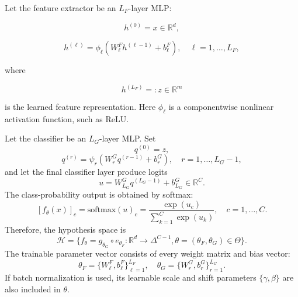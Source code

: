 \documentclass[11pt,a4paper]{article}
\theoremstyle{definition}
\begin{document}
Let the feature extractor be an $L_F$-layer MLP:

\[
h^{(0)} = x \in \mathbb{R}^d,
\]

\[
h^{(\ell)} = \phi_\ell \left( W_\ell^F h^{(\ell-1)} + b_\ell^F \right), \quad \ell = 1, \dots, L_F,
\]

where

\[
h^{(L_F)} =: z \in \mathbb{R}^m
\]

is the learned feature representation. Here $\phi_\ell$ is a componentwise nonlinear activation function, such as ReLU.

Let the classifier be an $L_G$-layer MLP. Set
\[
q^{(0)} = z,
\]
\[
q^{(r)} = \psi_r \left( W_r^G q^{(r-1)} + b_r^G \right), \quad r = 1, \dots, L_G - 1,
\]
and let the final classifier layer produce logits
\[
u = W_{L_G}^G q^{(L_G-1)} + b_{L_G}^G \in \mathbb{R}^C.
\]
The class-probability output is obtained by softmax:
\[
[f_\theta(x)]_c = \text{softmax}(u)_c = \frac{\exp(u_c)}{\sum_{k=1}^C \exp(u_k)}, \quad c = 1, \dots, C.
\]
Therefore, the hypothesis space is
\[
\mathcal{H} = \{ f_\theta = g_{\theta_G} \circ e_{\theta_F} : \mathbb{R}^d \to \Delta^{C-1}, \theta = (\theta_F, \theta_G) \in \Theta \}.
\]
The trainable parameter vector consists of every weight matrix and bias vector:
\[
\theta_F = \{ W_\ell^F, b_\ell^F \}_{\ell=1}^{L_F}, \quad \theta_G = \{ W_r^G, b_r^G \}_{r=1}^{L_G}.
\]
If batch normalization is used, its learnable scale and shift parameters $\{ \gamma, \beta \}$ are also included in $\theta$.
\end{document}
